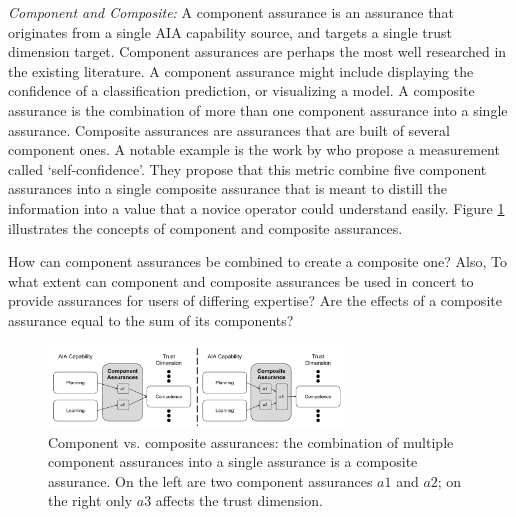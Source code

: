 \emph{Component and Composite:}
A component assurance is an assurance that originates from a single AIA capability source, and targets a single trust dimension target. Component assurances are perhaps the most well researched in the existing literature. A component assurance might include displaying the confidence of a classification prediction, or visualizing a model. A composite assurance is the combination of more than one component assurance into a single assurance. Composite assurances are assurances that are built of several component ones. A notable example is the work by \citet{Aitken2016-cv} who propose a measurement called `self-confidence'. They propose that this metric combine five component assurances into a single composite assurance that is meant to distill the information into a value that a novice operator could understand easily. Figure \ref{fig:assurance_mapping} illustrates the concepts of component and composite assurances. 

How can component assurances be combined to create a composite one? Also, To what extent can component and composite assurances be used in concert to provide assurances for users of differing expertise? Are the effects of a composite assurance equal to the sum of its components?

\begin{figure}[!htbp]
    \centering
    \includegraphics[width=0.7\textwidth]{Figures/Assurance_component_composite.pdf}
    \caption{%
    Component vs. composite assurances: the combination of multiple component assurances into a single assurance is a composite assurance. On the left are two component assurances $a1$ and $a2$; on the right only $a3$ affects the trust dimension.}
    \label{fig:assurance_mapping}
\end{figure}
